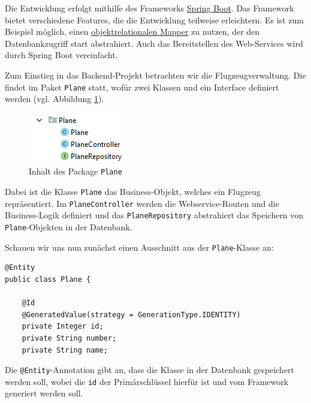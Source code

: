 \documentclass[a4paper, 11pt]{article}
\begin{document}
Die Entwicklung erfolgt mithilfe des Frameworks
\href{https://en.wikipedia.org/wiki/Spring_Boot#Spring_Boot}{Spring Boot}. Das
Framework bietet verschiedene Features, die die Entwicklung teilweise
erleichtern. Es ist zum Beispiel möglich, einen
\href{https://de.wikipedia.org/wiki/Objektrelationale_Abbildung}{objektrelationalen Mapper}
zu nutzen, der den Datenbankzugriff start abstrahiert. Auch das Bereitstellen
des Web-Services wird durch Spring Boot vereinfacht.

Zum Einstieg in das Backend-Projekt betrachten wir die Flugzeugverwaltung. Die
findet im Paket \texttt{Plane} statt, wofür zwei Klassen und ein Interface
definiert werden (vgl. Abbildung \ref{fig:planes_package}).

\begin{figure}[htpb]
    \centering
    \includegraphics{images/plane_package.png}
    \caption{Inhalt des Package \texttt{Plane}}
    \label{fig:planes_package}
\end{figure}

Dabei ist die Klasse \texttt{Plane} das Business-Objekt, welches ein Flugzeug
repräsentiert. Im \texttt{PlaneController} werden die Webservice-Routen und die
Business-Logik definiert und das \texttt{PlaneRepository} abstrahiert das
Speichern von \texttt{Plane}-Objekten in der Datenbank.

Schauen wir uns nun zunächst einen Ausschnitt aus der \texttt{Plane}-Klasse an:

\begin{lstlisting}
@Entity
public class Plane {

    @Id
    @GeneratedValue(strategy = GenerationType.IDENTITY)
    private Integer id;
    private String number;
    private String name;
\end{lstlisting}

Die \lstinline{@Entity}-Annotation gibt an, dass die Klasse in der Datenbank
gespeichert werden soll, wobei die \lstinline{id} der Primärschlüssel hierfür
ist und vom Framework generiert werden soll.
\end{document}
